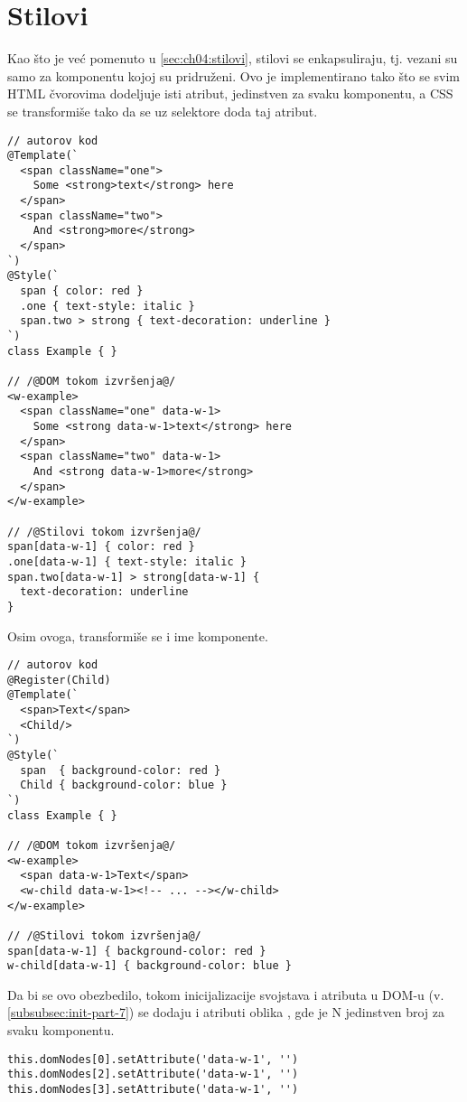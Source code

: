 \section{Stilovi}\label{sec:ch05:stilovi}

Kao što je već pomenuto u \cref{sec:ch04:stilovi}, stilovi se enkapsuliraju, tj. vezani su samo za komponentu kojoj su pridruženi.
Ovo je implementirano tako što se svim HTML čvorovima dodeljuje isti atribut, jedinstven za svaku komponentu, a CSS se transformiše tako da se uz selektore doda taj atribut.

\begin{lstlisting}
// autorov kod
@Template(`
  <span className="one">
    Some <strong>text</strong> here
  </span>
  <span className="two">
    And <strong>more</strong>
  </span>
`)
@Style(`
  span { color: red }
  .one { text-style: italic }
  span.two > strong { text-decoration: underline }
`)
class Example { }

// /@DOM tokom izvršenja@/
<w-example>
  <span className="one" data-w-1>
    Some <strong data-w-1>text</strong> here
  </span>
  <span className="two" data-w-1>
    And <strong data-w-1>more</strong>
  </span>
</w-example>

// /@Stilovi tokom izvršenja@/
span[data-w-1] { color: red }
.one[data-w-1] { text-style: italic }
span.two[data-w-1] > strong[data-w-1] {
  text-decoration: underline
}
\end{lstlisting}

Osim ovoga, transformiše se i ime komponente.

\begin{lstlisting}
// autorov kod
@Register(Child)
@Template(`
  <span>Text</span>
  <Child/>
`)
@Style(`
  span  { background-color: red }
  Child { background-color: blue }
`)
class Example { }

// /@DOM tokom izvršenja@/
<w-example>
  <span data-w-1>Text</span>
  <w-child data-w-1><!-- ... --></w-child>
</w-example>

// /@Stilovi tokom izvršenja@/
span[data-w-1] { background-color: red }
w-child[data-w-1] { background-color: blue }
\end{lstlisting}

Da bi se ovo obezbedilo, tokom inicijalizacije svojstava i atributa u DOM-u (v. \cref{subsubsec:init-part-7}) se dodaju i atributi oblika , gde je \code N jedinstven broj za svaku komponentu.

\begin{lstlisting}
this.domNodes[0].setAttribute('data-w-1', '')
this.domNodes[2].setAttribute('data-w-1', '')
this.domNodes[3].setAttribute('data-w-1', '')
\end{lstlisting}
